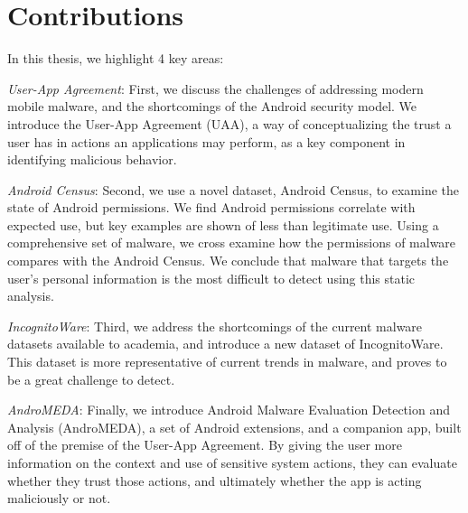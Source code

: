 \section{Contributions}
In this thesis, we highlight 4 key areas:
\begin{smitemize}
\item \textit{User-App Agreement}: First, we discuss the challenges of addressing modern mobile malware, and the shortcomings of the Android security model. We introduce the User-App Agreement (UAA), a way of conceptualizing the trust a user has in actions an applications may perform, as a key component in identifying malicious behavior.
\item \textit{Android Census}: Second, we use a novel dataset, Android Census, to examine the state of Android permissions. We find Android permissions correlate with expected use, but key examples are shown of less than legitimate use. Using a comprehensive set of malware, we cross examine how the permissions of malware compares with the Android Census. We conclude that malware that targets the user's personal information is the most difficult to detect using this static analysis.
\item \textit{IncognitoWare}: Third, we address the shortcomings of the current malware datasets available to academia, and introduce a new dataset of IncognitoWare. This dataset is more representative of current trends in malware, and proves to be a great challenge to detect.
\item \textit{AndroMEDA}: Finally, we introduce Android Malware Evaluation Detection and Analysis (AndroMEDA), a set of Android extensions, and a companion app, built off of the premise of the User-App Agreement. By giving the user more information on the context and use of sensitive system actions, they can evaluate whether they trust those actions, and ultimately whether the app is acting maliciously or not.
\end{smitemize}








